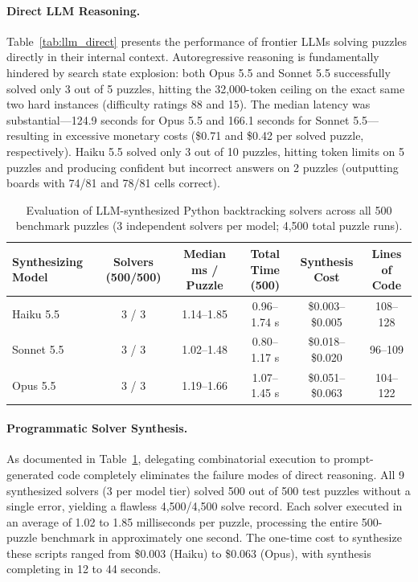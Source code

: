 \documentclass{article} %
\begin{document}
\paragraph{Direct LLM Reasoning.}
Table~\ref{tab:llm_direct} presents the performance of frontier LLMs solving puzzles directly in their internal context. Autoregressive reasoning is fundamentally hindered by search state explosion: both Opus 5.5 and Sonnet 5.5 successfully solved only 3 out of 5 puzzles, hitting the 32,000-token ceiling on the exact same two hard instances (difficulty ratings 88 and 15). The median latency was substantial—124.9 seconds for Opus 5.5 and 166.1 seconds for Sonnet 5.5—resulting in excessive monetary costs (\$0.71 and \$0.42 per solved puzzle, respectively). Haiku 5.5 solved only 3 out of 10 puzzles, hitting token limits on 5 puzzles and producing confident but incorrect answers on 2 puzzles (outputting boards with 74/81 and 78/81 cells correct).

\begin{table}[t]
\caption{Evaluation of LLM-synthesized Python backtracking solvers across all 500 benchmark puzzles (3 independent solvers per model; 4,500 total puzzle runs).}
\label{tab:llm_solvers}
\begin{center}
\begin{tabular}{lccccc}
\toprule
\textbf{Synthesizing Model} & \textbf{Solvers (500/500)} & \textbf{Median ms / Puzzle} & \textbf{Total Time (500)} & \textbf{Synthesis Cost} & \textbf{Lines of Code} \\
\midrule
Haiku 5.5  & 3 / 3 & 1.14--1.85 & 0.96--1.74 s & \$0.003--\$0.005 & 108--128 \\
Sonnet 5.5 & 3 / 3 & 1.02--1.48 & 0.80--1.17 s & \$0.018--\$0.020 & 96--109 \\
Opus 5.5   & 3 / 3 & 1.19--1.66 & 1.07--1.45 s & \$0.051--\$0.063 & 104--122 \\
\bottomrule
\end{tabular}
\end{center}
\end{table}

\paragraph{Programmatic Solver Synthesis.}
As documented in Table~\ref{tab:llm_solvers}, delegating combinatorial execution to prompt-generated code completely eliminates the failure modes of direct reasoning. All 9 synthesized solvers (3 per model tier) solved 500 out of 500 test puzzles without a single error, yielding a flawless 4,500/4,500 solve record. Each solver executed in an average of 1.02 to 1.85 milliseconds per puzzle, processing the entire 500-puzzle benchmark in approximately one second. The one-time cost to synthesize these scripts ranged from \$0.003 (Haiku) to \$0.063 (Opus), with synthesis completing in 12 to 44 seconds.
\end{document}
